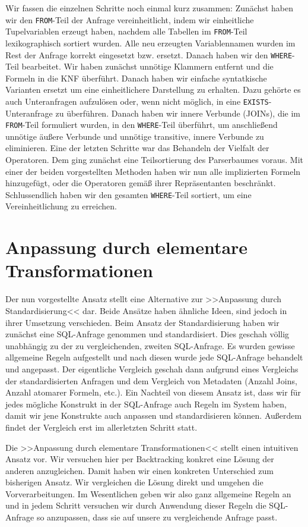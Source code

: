 Wir fassen die einzelnen Schritte noch einmal kurz zusammen: Zunächst haben wir den \verb|FROM|-Teil der Anfrage vereinheitlicht, indem wir einheitliche Tupelvariablen erzeugt haben, nachdem alle Tabellen im \verb|FROM|-Teil lexikographisch sortiert wurden. Alle neu erzeugten Variablennamen wurden im Rest der Anfrage korrekt eingesetzt bzw. ersetzt. Danach haben wir den \verb|WHERE|-Teil bearbeitet. Wir haben zunächst unnötige Klammern entfernt und die Formeln in die KNF überführt. Danach haben wir einfache syntatkische Varianten ersetzt um eine einheitlichere Darstellung zu erhalten. Dazu gehörte es auch Unteranfragen aufzulösen oder, wenn nicht möglich, in eine \verb|EXISTS|-Unteranfrage zu überführen. Danach haben wir innere Verbunde (JOINs), die im \verb|FROM|-Teil formuliert wurden, in den \verb|WHERE|-Teil überführt, um anschließend unnötige äußere Verbunde und unnötige transitive, innere Verbunde  zu eliminieren. Eine der letzten Schritte war das Behandeln der Vielfalt der Operatoren. Dem ging zunächst eine Teilsortierung des Parserbaumes voraus. Mit einer der beiden vorgestellten Methoden haben wir nun alle implizierten Formeln hinzugefügt, oder die Operatoren gemäß ihrer Repräsentanten beschränkt. Schlussendlich haben wir den gesamten \verb|WHERE|-Teil sortiert, um eine Vereinheitlichung zu erreichen.

\section{Anpassung durch elementare Transformationen}

Der nun vorgestellte Ansatz stellt eine Alternative zur >>Anpassung durch Standardisierung<< dar. Beide Ansätze haben ähnliche Ideen, sind jedoch in ihrer Umsetzung verschieden. Beim Ansatz der Standardisierung haben wir zunächst eine SQL-Anfrage genommen und standardisiert. Dies geschah völlig unabhängig zu der zu vergleichenden, zweiten SQL-Anfrage. Es wurden gewisse allgemeine Regeln aufgestellt und nach diesen wurde jede SQL-Anfrage behandelt und angepasst. Der eigentliche Vergleich geschah dann aufgrund eines Vergleichs der standardisierten Anfragen und dem Vergleich von Metadaten (Anzahl Joins, Anzahl atomarer Formeln, etc.). Ein Nachteil von diesem Ansatz ist, dass wir für jedes mögliche Konstrukt in der SQL-Anfrage auch Regeln im System haben, damit wir jene Konstrukte auch anpassen und standardisieren können. Außerdem findet der Vergleich erst im allerletzten Schritt statt.

Die >>Anpassung durch elementare Transformationen<< stellt einen intuitiven Ansatz vor. Wir versuchen hier per Backtracking konkret eine Lösung der anderen anzugleichen. Damit haben wir einen konkreten Unterschied zum bisherigen Ansatz. Wir vergleichen die Lösung direkt und umgehen die Vorverarbeitungen. Im Wesentlichen geben wir also ganz allgemeine Regeln an und in jedem Schritt versuchen wir durch Anwendung dieser Regeln die SQL-Anfrage so anzupassen, dass sie auf unsere zu vergleichende Anfrage passt.

